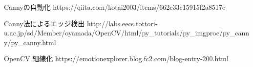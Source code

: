 Cannyの自動化
https://qiita.com/kotai2003/items/662c33c15915f2a8517e

Canny法によるエッジ検出
http://labs.eecs.tottori-u.ac.jp/sd/Member/oyamada/OpenCV/html/py_tutorials/py_imgproc/py_canny/py_canny.html

OpenCV 細線化
https://emotionexplorer.blog.fc2.com/blog-entry-200.html
